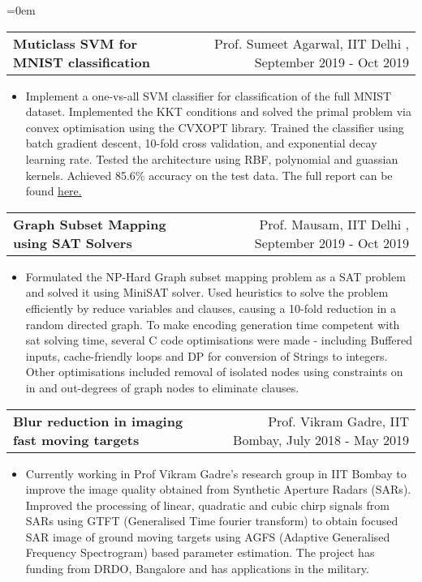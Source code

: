 \documentclass{article}
\makeatletter
\newenvironment{longversion}{}{} %
\newcommand{\headerrow}[2]
{\begin{tabular*}{\linewidth}{l@{\extracolsep{\fill}}r}
	#1 &
	#2 \\
\end{tabular*}}
\makeatother
\begin{document}
\begin{longversion}
\begin{list} {}{\leftmargin=0em}
 \item[]
\headerrow { \textbf{Muticlass SVM for MNIST classification}} {Prof. Sumeet Agarwal, IIT Delhi , September 2019 - Oct 2019}
 \begin{itemize} \item[]
Implement a one-vs-all SVM classifier for classification of the full MNIST dataset. Implemented the KKT conditions and solved the primal problem via convex optimisation using the CVXOPT library. Trained the classifier using batch gradient descent, 10-fold cross validation, and exponential decay learning rate. Tested the architecture using RBF, polynomial and guassian kernels. Achieved 85.6\% accuracy on the test data. The full report can be found \href{https://csciitd-my.sharepoint.com/:b:/g/personal/ee1170938_csciitd_onmicrosoft_com/ER9gs-cvP5tBtehLDkQoJzsBKB3wo4UxdHrTofb7r1Eo5w?e=cjrFgh}{here.}
 \end{itemize}

 \item[]
\headerrow { \textbf{Graph Subset Mapping using SAT Solvers}} {Prof. Mausam, IIT Delhi , September 2019 - Oct 2019}
 \begin{itemize} \item[]
Formulated the NP-Hard Graph subset mapping problem as a SAT problem and solved it using MiniSAT solver. Used heuristics to solve the problem efficiently by reduce variables and clauses, causing a 10-fold reduction in a random directed graph. To make encoding generation time competent with sat solving time, several C code optimisations were made - including Buffered inputs, cache-friendly loops and DP for conversion of Strings to integers. Other optimisations included removal of isolated nodes using constraints on in and out-degrees of graph nodes to eliminate clauses.
 \end{itemize}

\item[]
\headerrow { \textbf{Blur reduction in imaging fast moving targets}} {Prof. Vikram Gadre, IIT Bombay, July 2018 - May 2019}
 \begin{itemize} \item[]
Currently working in Prof Vikram Gadre's research group in IIT Bombay to improve the image quality obtained from Synthetic Aperture Radars (SARs). Improved the processing of linear, quadratic and cubic chirp signals from SARs using GTFT (Generalised Time fourier transform) to obtain focused SAR image of ground moving targets using AGFS (Adaptive Generalised Frequency Spectrogram) based parameter estimation. The project has funding from DRDO, Bangalore and has applications in the military. 
 \end{itemize}
 

\end{list}
\end{longversion}
\end{document}
